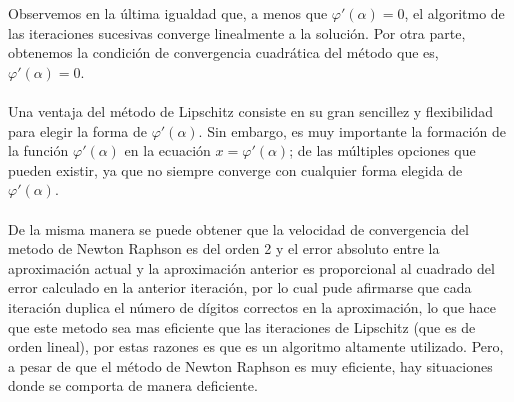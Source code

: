 Observemos en la última igualdad que, a menos que $ \varphi'(\alpha) = 0 $, el algoritmo de las iteraciones sucesivas
converge linealmente a la solución. Por otra parte, obtenemos la condición de convergencia cuadrática del método que es, $ \varphi'(\alpha) = 0 $.
\\\\
Una ventaja del método de Lipschitz consiste en su gran sencillez y flexibilidad para elegir la forma de $ \varphi'(\alpha)$. Sin embargo, es muy importante la formación de la función $ \varphi'(\alpha) $ en la ecuación $ x = \varphi'(\alpha)$; de las múltiples opciones que pueden existir, ya que no siempre converge con cualquier forma elegida de $ \varphi'(\alpha) $.
\\\\
De la misma manera se puede obtener que la velocidad de convergencia del metodo de Newton Raphson es del orden 2 y el error absoluto entre la aproximación actual y la aproximación anterior es proporcional al cuadrado del error calculado en la anterior iteración, por lo cual pude afirmarse que cada iteración duplica el número de dígitos correctos en la aproximación, lo que hace que este metodo sea mas eficiente que las iteraciones de Lipschitz (que es de orden lineal), por estas razones es que es un algoritmo altamente utilizado. Pero, a pesar de que el método de Newton Raphson es muy eficiente, hay situaciones donde se comporta de manera deficiente.



